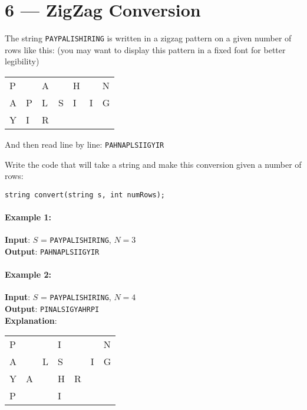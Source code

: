\section{6 --- ZigZag Conversion}
The string \texttt{PAYPALISHIRING} is written in a zigzag pattern on a given number of rows like this: (you may want to display this pattern in a fixed font for better legibility)
\begin{table}[H]
	\begin{tabular}{lllllll}
P & &  A & & H & &  N\\
A  & P  & L  & S  & I  & I &  G\\
Y &  I & R &  &  &  &
	\end{tabular}
\end{table}
And then read line by line: \texttt{PAHNAPLSIIGYIR}
\par
Write the code that will take a string and make this conversion given a number of rows:
\begin{lstlisting}[style=customc]
string convert(string s, int numRows);
\end{lstlisting}

\paragraph{Example 1:}

\begin{flushleft}
	\textbf{Input}: $S$ = \texttt{PAYPALISHIRING}, $N = 3$
	\\
\textbf{Output}: \texttt{PAHNAPLSIIGYIR}
\\
\end{flushleft}


\paragraph{Example 2:}

\begin{flushleft}
	\textbf{Input}: $S$ = \texttt{PAYPALISHIRING}, $N = 4$
	\\
\textbf{Output}: \texttt{PINALSIGYAHRPI}
\\
\textbf{Explanation}:
\begin{table}[H]
	\begin{tabular}{lllllll}
		P & &   &  I &  & &  N\\
		A  &  & L  & S   &  & I &  G\\
		Y &  A &  & H & R &  &  \\
		P &  &  & I &  &  &
	\end{tabular}
\end{table}
\end{flushleft}
